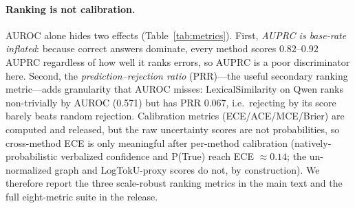 \documentclass[11pt]{article}
\begin{document}
\paragraph{Ranking is not calibration.} AUROC alone hides two effects
(Table~\ref{tab:metrics}). First, \emph{AUPRC is base-rate inflated}: because correct
answers dominate, every method scores $0.82$--$0.92$ AUPRC regardless of how well it
ranks errors, so AUPRC is a poor discriminator here. Second, the
\emph{prediction--rejection ratio} (PRR)---the useful secondary ranking metric---adds
granularity that AUROC misses: LexicalSimilarity on Qwen ranks non-trivially by AUROC
(0.571) but has PRR $0.067$, i.e.\ rejecting by its score barely beats random rejection.
Calibration metrics (ECE/ACE/MCE/Brier) are computed and released, but the raw
uncertainty scores are not probabilities, so cross-method ECE is only meaningful after
per-method calibration (natively-probabilistic verbalized confidence and P(True) reach
ECE $\approx 0.14$; the un-normalized graph and LogTokU-proxy scores do not, by construction).
We therefore report the three scale-robust ranking metrics in the main text and the full
eight-metric suite in the release.
\end{document}

